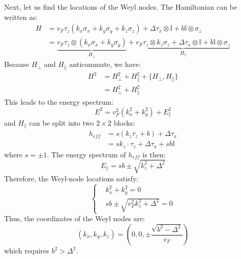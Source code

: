 Next, let us find the locations of the Weyl nodes. The Hamiltonian can be written as:
\begin{equation}
\begin{aligned}
H &= v_F \tau_z (k_x \sigma_x + k_y \sigma_y + k_z \sigma_z) + \Delta \tau_x \otimes \mathbb{I} + b \mathbb{I} \otimes \sigma_z \\
&= \underbrace{v_F \tau_z \otimes (k_x \sigma_x + k_y \sigma_y)}_{H_\perp} + \underbrace{v_F \tau_z \otimes k_z \sigma_z + \Delta \tau_x \otimes \mathbb{I} + b \mathbb{I} \otimes \sigma_z}_{H_\parallel}
\end{aligned}
\end{equation}
Because $H_\perp$ and $H_\parallel$ anticommute, we have:
\begin{equation}
\begin{aligned}
H^2 &= H_\perp^2 + H_\parallel^2 + \{H_\perp, H_\parallel\} \\
&= H_\perp^2 + H_\parallel^2
\end{aligned}
\end{equation}
This leads to the energy spectrum:
\begin{equation}
E^2 = v_F^2 (k_x^2 + k_y^2) + E_\parallel^2
\end{equation}
and $H_\parallel$ can be split into two $2 \times 2$ blocks:
\begin{equation}
\begin{aligned}
h_{eff} &= s(k_z \tau_z + b) + \Delta \tau_x \\
&= s k_z \cdot \tau_z + \Delta \tau_x + s b \mathbb{I}
\end{aligned}
\end{equation}
where $s=\pm 1$. The energy spectrum of $h_{eff}$ is then:
\begin{equation}
E_\parallel = s b \pm \sqrt{k_z^2 + \Delta^2}
\end{equation}
Therefore, the Weyl-node locations satisfy:
\begin{equation}
    \left\{
    \begin{aligned}
    & k_x^2 + k_y^2 = 0 \\
    & s b \pm \sqrt{v_F^2 k_z^2 + \Delta^2} = 0
    \end{aligned}
    \right.
    \end{equation}
Thus, the coordinates of the Weyl nodes are:
\begin{equation}
(k_x, k_y, k_z) = (0, 0, \pm \frac{\sqrt{b^2-\Delta^2}}{v_F})
\end{equation}
which requires $b^2 > \Delta^2$.

